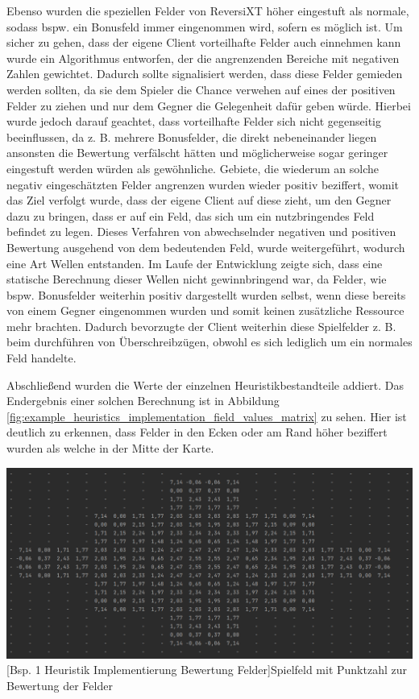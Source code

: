 \documentclass[12pt,a4paper,bibliography=totocnumbered,listof=totocnumbered]{article}
\begin{document}
Ebenso wurden die speziellen Felder von ReversiXT höher eingestuft als normale, sodass bspw. ein Bonusfeld immer eingenommen wird, sofern es möglich ist. 
Um sicher zu gehen, dass der eigene Client vorteilhafte Felder auch einnehmen kann wurde ein Algorithmus entworfen, der die angrenzenden Bereiche mit negativen Zahlen gewichtet. Dadurch sollte signalisiert werden, dass diese Felder gemieden werden sollten, da sie dem Spieler die Chance verwehen auf eines der positiven Felder zu ziehen und nur dem Gegner die Gelegenheit dafür geben würde. Hierbei wurde jedoch darauf geachtet, dass vorteilhafte Felder sich nicht gegenseitig beeinflussen, da z. B. mehrere Bonusfelder, die direkt nebeneinander liegen ansonsten die Bewertung verfälscht hätten und möglicherweise sogar geringer eingestuft werden würden als gewöhnliche. Gebiete, die wiederum an solche negativ eingeschätzten Felder angrenzen wurden wieder positiv beziffert, womit das Ziel verfolgt wurde, dass der eigene Client auf diese zieht, um den Gegner dazu zu bringen, dass er auf ein Feld, das sich um ein nutzbringendes Feld befindet zu legen. Dieses Verfahren von abwechselnder negativen und positiven Bewertung ausgehend von dem bedeutenden Feld, wurde weitergeführt, wodurch eine Art Wellen entstanden.
Im Laufe der Entwicklung zeigte sich, dass eine statische Berechnung dieser Wellen nicht gewinnbringend war, da Felder, wie bspw. Bonusfelder weiterhin positiv dargestellt wurden selbst, wenn diese bereits von einem Gegner eingenommen wurden und somit keinen zusätzliche Ressource mehr brachten. Dadurch bevorzugte der Client weiterhin diese Spielfelder z. B. beim durchführen von Überschreibzügen, obwohl es sich lediglich um ein normales Feld handelte.

Abschließend wurden die Werte der einzelnen Heuristikbestandteile addiert. Das Endergebnis einer solchen Berechnung ist in Abbildung \ref{fig:example_heuristics_implementation_field_values_matrix} zu sehen. Hier ist deutlich zu erkennen, dass Felder in den Ecken oder am Rand höher beziffert wurden als welche in der Mitte der Karte.

\vspace{1em}
\begin{minipage}{\linewidth}
	\centering
	\includegraphics[width=0.8\linewidth]{pics/heuristics_implementation_field_values_matrix.png}
	[Bsp. 1 Heuristik Implementierung Bewertung Felder]{Spielfeld mit Punktzahl zur Bewertung der Felder}
	\label{fig:example_heuristics_implementation_field_values_matrix}
\end{minipage} 
\\
\end{document}
